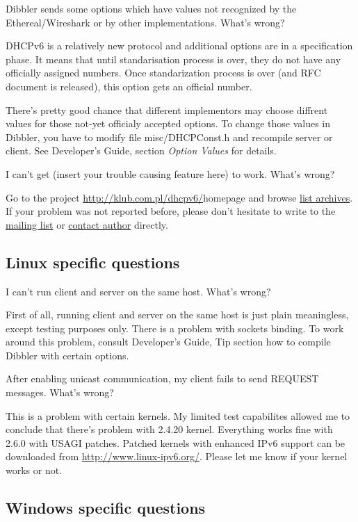 \Q Dibbler sends some options which have values not recognized by the
Ethereal/Wireshark or by other implementations. What's wrong?

\A DHCPv6 is a relatively new protocol and additional options are in a
specification phase. It means that until standarisation process is
over, they do not have any officially assigned numbers. Once
standarization process is over (and RFC document is released), this
option gets an official number. 

There's pretty good chance that different implementors may choose
diffrent values for those not-yet officialy accepted options. To
change those values in Dibbler, you have to modify file
misc/DHCPConst.h and recompile server or client. See Developer's
Guide, section \emph{Option Values} for details.

\Q I can't get (insert your trouble causing feature here) to
work. What's wrong? 

\A Go to the project \url{http://klub.com.pl/dhcpv6/}{homepage} and
browse \href{http://klub.com.pl/lists/dibbler/}{list archives}. If
your problem was not reported before, please don't hesitate to write
to the
\href{http://klub.com.pl/cgi-bin/mailman/listinfo/dibbler}{mailing
  list} or \href{mailto:thomson(at)klub.com.pl}{contact author}
directly. 

\subsection{Linux specific questions}

\Q I can't run client and server on the same host. What's wrong?

\A First of all, running client and server on the same host is just
plain meaningless, except testing purposes only. There is a problem
with sockets binding. To work around this problem, consult Developer's
Guide, Tip section how to compile Dibbler with certain options.

\Q After enabling unicast communication, my client fails to send
REQUEST messages. What's wrong?

\A This is a problem with certain kernels. My limited test capabilites
allowed me to conclude that there's problem with 2.4.20
kernel. Everything works fine with 2.6.0 with USAGI patches. Patched 
kernels with enhanced IPv6 support can be downloaded from
\url{http://www.linux-ipv6.org/}. Please let me know if your kernel
works or not.

\subsection{Windows specific questions}

